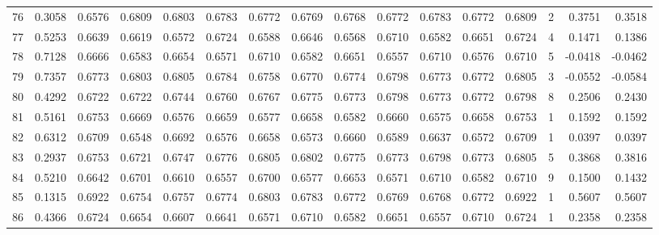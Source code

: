 \begin{tabular}{lrrrrrrrrrrrrrrr}
76  &      0.3058 &  0.6576 &  0.6809 &  0.6803 &  0.6783 &  0.6772 &  0.6769 &  0.6768 &  0.6772 &  0.6783 &   0.6772 &     0.6809 &      2 &                    0.3751 &                     0.3518 \\
77  &      0.5253 &  0.6639 &  0.6619 &  0.6572 &  0.6724 &  0.6588 &  0.6646 &  0.6568 &  0.6710 &  0.6582 &   0.6651 &     0.6724 &      4 &                    0.1471 &                     0.1386 \\
78  &      0.7128 &  0.6666 &  0.6583 &  0.6654 &  0.6571 &  0.6710 &  0.6582 &  0.6651 &  0.6557 &  0.6710 &   0.6576 &     0.6710 &      5 &                   -0.0418 &                    -0.0462 \\
79  &      0.7357 &  0.6773 &  0.6803 &  0.6805 &  0.6784 &  0.6758 &  0.6770 &  0.6774 &  0.6798 &  0.6773 &   0.6772 &     0.6805 &      3 &                   -0.0552 &                    -0.0584 \\
80  &      0.4292 &  0.6722 &  0.6722 &  0.6744 &  0.6760 &  0.6767 &  0.6775 &  0.6773 &  0.6798 &  0.6773 &   0.6772 &     0.6798 &      8 &                    0.2506 &                     0.2430 \\
81  &      0.5161 &  0.6753 &  0.6669 &  0.6576 &  0.6659 &  0.6577 &  0.6658 &  0.6582 &  0.6660 &  0.6575 &   0.6658 &     0.6753 &      1 &                    0.1592 &                     0.1592 \\
82  &      0.6312 &  0.6709 &  0.6548 &  0.6692 &  0.6576 &  0.6658 &  0.6573 &  0.6660 &  0.6589 &  0.6637 &   0.6572 &     0.6709 &      1 &                    0.0397 &                     0.0397 \\
83  &      0.2937 &  0.6753 &  0.6721 &  0.6747 &  0.6776 &  0.6805 &  0.6802 &  0.6775 &  0.6773 &  0.6798 &   0.6773 &     0.6805 &      5 &                    0.3868 &                     0.3816 \\
84  &      0.5210 &  0.6642 &  0.6701 &  0.6610 &  0.6557 &  0.6700 &  0.6577 &  0.6653 &  0.6571 &  0.6710 &   0.6582 &     0.6710 &      9 &                    0.1500 &                     0.1432 \\
85  &      0.1315 &  0.6922 &  0.6754 &  0.6757 &  0.6774 &  0.6803 &  0.6783 &  0.6772 &  0.6769 &  0.6768 &   0.6772 &     0.6922 &      1 &                    0.5607 &                     0.5607 \\
86  &      0.4366 &  0.6724 &  0.6654 &  0.6607 &  0.6641 &  0.6571 &  0.6710 &  0.6582 &  0.6651 &  0.6557 &   0.6710 &     0.6724 &      1 &                    0.2358 &                     0.2358 \\

\end{tabular}
